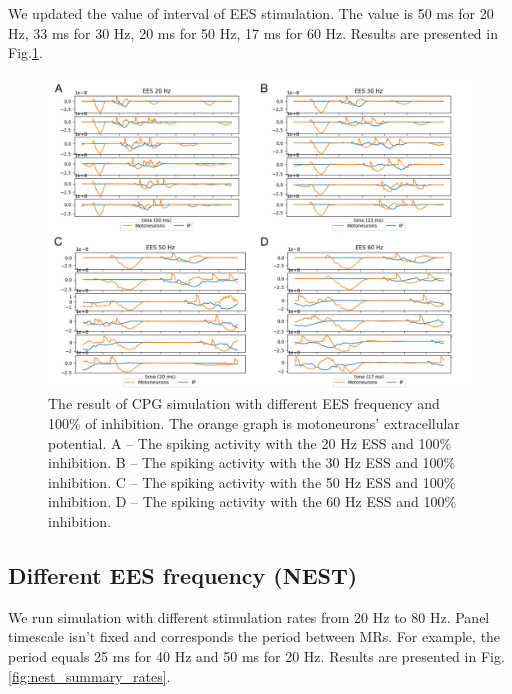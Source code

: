 \documentclass[]{elsarticle}
\begin{document}
We updated the value of interval of EES stimulation. The value is 50 ms for 20 Hz, 33 ms for 30 Hz, 20 ms for 50 Hz, 17 ms for 60 Hz. Results are presented in Fig.\ref{fig:30_100}.

\begin{figure}[ht!]
	\centering
	\includegraphics[width=1.0\textwidth]{results/diff_freq.png}
	\caption{The result of CPG simulation with different EES frequency and 100\% of inhibition. The orange graph is motoneurons' extracellular potential. 
    A -- The spiking activity with the 20 Hz ESS and 100\% inhibition. 
    B -- The spiking activity with the 30 Hz ESS and 100\% inhibition. 
    C -- The spiking activity with the 50 Hz ESS and 100\% inhibition. 
    D -- The spiking activity with the 60 Hz ESS and 100\% inhibition.}
    \label{fig:30_100}
\end{figure}


\subsection{Different EES frequency (NEST)}

We run simulation with different stimulation rates from 20 Hz to 80 Hz. Panel timescale isn’t fixed and corresponds the period between MRs. For example, the period equals 25 ms for 40 Hz and 50 ms for 20 Hz. Results are presented in Fig.\ref{fig:nest_summary_rates}.
\end{document}
